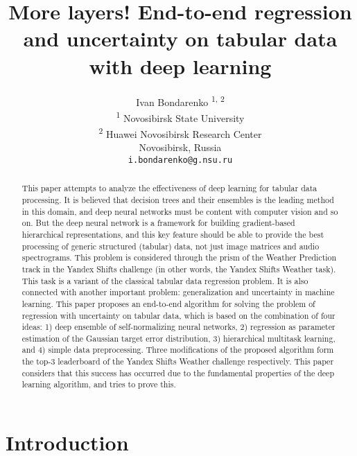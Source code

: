 \documentclass{article}
\title{More layers! End-to-end regression and uncertainty on tabular data  with deep learning}
\author{Ivan Bondarenko \textsuperscript{1, 2} \\
  \textsuperscript{1} Novosibirsk State University \\
  \textsuperscript{2} Huawei Novosibirsk Research Center \\
  Novosibirsk, Russia \\
  \texttt{i.bondarenko@g.nsu.ru} \\
}
\begin{document}
\maketitle

\begin{abstract}
  This paper attempts to analyze the effectiveness of deep learning for tabular data processing. It is believed that decision trees and their ensembles is the leading method in this domain, and deep neural networks must be content with computer vision and so on. But the deep neural network is a framework for building gradient-based hierarchical representations, and this key feature should be able to provide the best processing of generic structured (tabular) data, not just image matrices and audio spectrograms. This problem is considered through the prism of the Weather Prediction track in the Yandex Shifts challenge (in other words, the Yandex Shifts Weather task). This task is a variant of the classical tabular data regression problem. It is also connected with another important problem: generalization and uncertainty in machine learning. This paper proposes an end-to-end algorithm for solving the problem of regression with uncertainty on tabular data, which is based on the combination of four ideas: 1) deep ensemble of self-normalizing neural networks, 2) regression as parameter estimation of the Gaussian target error distribution, 3) hierarchical multitask learning, and 4) simple data preprocessing. Three modifications of the proposed algorithm form the top-3 leaderboard of the Yandex Shifts Weather challenge respectively. This paper considers that this success has occurred due to the fundamental properties of the deep learning algorithm, and tries to prove this.
\end{abstract}

\section{Introduction}
\end{document}
